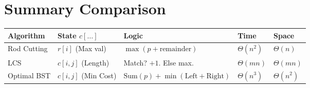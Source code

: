 \documentclass[10pt, a4paper]{article}
\begin{document}
\hrulefill

\section*{Summary Comparison}
\begin{table}[h]
\centering
\begin{tabular}{@{}lllll@{}}
\toprule
\textbf{Algorithm} & \textbf{State $c[\dots]$} & \textbf{Logic} & \textbf{Time} & \textbf{Space} \\ \midrule
Rod Cutting & $r[i]$ (Max val) & $\max(p + \text{remainder})$ & $\Theta(n^2)$ & $\Theta(n)$ \\
LCS & $c[i,j]$ (Length) & Match? $+1$. Else max. & $\Theta(mn)$ & $\Theta(mn)$ \\
Optimal BST & $c[i,j]$ (Min Cost) & $\text{Sum}(p) + \min(\text{Left} + \text{Right})$ & $\Theta(n^3)$ & $\Theta(n^2)$ \\ \bottomrule
\end{tabular}
\end{table}
\end{document}
